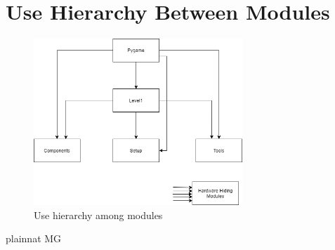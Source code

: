 \documentclass[12pt, titlepage]{article}
\begin{document}
\section{Use Hierarchy Between Modules} \label{SecUse}

\begin{figure}[H]
\centering
\includegraphics[width=0.7\textwidth]{UsesHierarchy.png}
\caption{Use hierarchy among modules}
\label{FigUH}
\end{figure}


 {plainnat}
 {MG}
\end{document}
